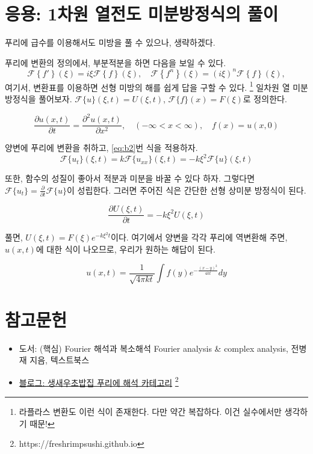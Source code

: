 \documentclass[article, oneside]{oblivoir}
\begin{document}
\section{응용: 1차원 열전도 미분방정식의 풀이}
푸리에 급수를 이용해서도 미방을 풀 수 있으나, 생략하겠다.

푸리에 변환의 정의에서, 부분적분을 하면 다음을 보일 수 있다.
\begin{equation}
    \mathcal{F}\left\{f' \right\} (\xi) = i \xi \mathcal{F}\left\{f \right\} (\xi), \quad \mathcal{F}\left\{f^n \right\} (\xi) = \left(i \xi\right)^n \mathcal{F}\left\{f \right\} (\xi), \label{eq:b2}
\end{equation}
여기서, 변환표를 이용하면 선형 미방의 해를 쉽게 답을 구할 수 있다.
\footnote{라플라스 변환도 이런 식이 존재한다. 다만 약간 복잡하다. 이건 실수에서만 생각하기 때문!}
일차원 열 미분방정식을 풀어보자.
$\mathcal{F}\{u\}(\xi, t) = U(\xi, t)$, $\mathcal{F}\{f\}(x) = F(\xi)$로 정의한다.

$$\frac{\partial u(x,t)}{\partial t} = \frac{\partial^2 u(x,t)}{\partial x^2}, \quad (-\infty < x < \infty), \quad f(x) = u(x,0) $$

양변에 푸리에 변환을 취하고, \ref{eq:b2}번 식을 적용하자.
$$\mathcal{F}\{u_t\}(\xi, t) = k \mathcal{F}\{u_{xx}\}(\xi, t) =  - k \xi^2 \mathcal{F}\{u\}(\xi, t)$$

또한, 함수의 성질이 좋아서 적분과 미분을 바꿀 수 있다 하자. 그렇다면 $\mathcal{F}\{u_t\} = \frac{\partial}{\partial t}\mathcal{F}\{u\}$이 성립한다. 그러면 주어진 식은 간단한 선형 상미분 방정식이 된다.

$$\frac{\partial U(\xi, t)}{\partial t} = - k \xi^2 U(\xi, t)$$

풀면, $U(\xi, t) = F(\xi) e^{-k \xi ^2 t}$이다. 여기에서 양변을 각각 푸리에 역변환해 주면, $u(x,t)$에 대한 식이 나오므로, 우리가 원하는 해답이 된다.

$$u(x,t) = \frac{1}{\sqrt{4 \pi k t}} \int f(y) e^{-\frac{\left(x-y\right)^2}{4 k t}} dy$$

\section{참고문헌}
\begin{itemize}
    \item 도서: (핵심) Fourier 해석과 복소해석 Fourier analysis \& complex analysis, 전병재 지음, 텍스트북스
    \item \href{https://freshrimpsushi.github.io/}{블로그: 생새우초밥집 \> 푸리에 해석 카테고리} \footnote{https://freshrimpsushi.github.io}
\end{itemize}
\end{document}
